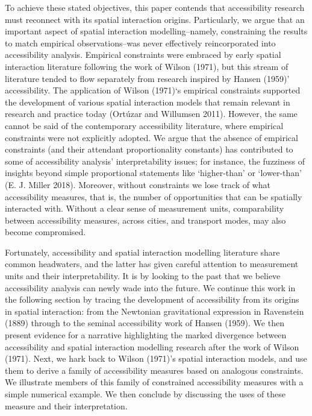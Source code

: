\documentclass[
]{article}
\begin{document}
To achieve these stated objectives, this paper contends that
accessibility research must reconnect with its spatial interaction
origins. Particularly, we argue that an important aspect of spatial
interaction modelling--namely, constraining the results to match
empirical observations--was never effectively reincorporated into
accessibility analysis. Empirical constraints were embraced by early
spatial interaction literature following the work of Wilson (1971), but
this stream of literature tended to flow separately from research
inspired by Hansen (1959)' accessibility. The application of Wilson
(1971)`s empirical constraints supported the development of various
spatial interaction models that remain relevant in research and practice
today (Ortúzar and Willumsen 2011). However, the same cannot be said of
the contemporary accessibility literature, where empirical constraints
were not explicitly adopted. We argue that the absence of empirical
constraints (and their attendant proportionality constants) has
contributed to some of accessibility analysis' interpretability issues;
for instance, the fuzziness of insights beyond simple proportional
statements like `higher-than' or `lower-than' (E. J. Miller 2018).
Moreover, without constraints we lose track of what accessibility
measures, that is, the number of opportunities that can be spatially
interacted with. Without a clear sense of measurement units,
comparability between accessibility measures, across cities, and
transport modes, may also become compromised.

Fortunately, accessibility and spatial interaction modelling literature
share common headwaters, and the latter has given careful attention to
measurement units and their interpretability. It is by looking to the
past that we believe accessibility analysis can newly wade into the
future. We continue this work in the following section by tracing the
development of accessibility from its origins in spatial interaction:
from the Newtonian gravitational expression in Ravenstein (1889) through
to the seminal accessibility work of Hansen (1959). We then present
evidence for a narrative highlighting the marked divergence between
accessibility and spatial interaction modelling research after the work
of Wilson (1971). Next, we hark back to Wilson (1971)'s spatial
interaction models, and use them to derive a family of accessibility
measures based on analogous constraints. We illustrate members of this
family of constrained accessibility measures with a simple numerical
example. We then conclude by discussing the uses of these measure and
their interpretation.
\end{document}
